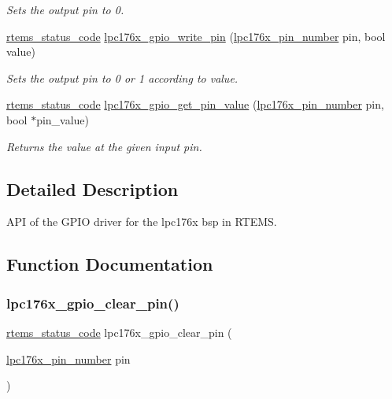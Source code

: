 \begin{DoxyCompactItemize}
\begin{DoxyCompactList}\small\item\em Sets the output pin to 0. \end{DoxyCompactList}\item 
\mbox{\hyperlink{group__ClassicStatus_ga545d41846817eaba6143d52ee4d9e9fe}{rtems\+\_\+status\+\_\+code}} \mbox{\hyperlink{lpc-gpio_8h_ad010bb47d4e2ab9c09a42193cc25d501}{lpc176x\+\_\+gpio\+\_\+write\+\_\+pin}} (\mbox{\hyperlink{common-types_8h_a8215ced1557c43bc5925b691a3c1dc23}{lpc176x\+\_\+pin\+\_\+number}} pin, bool value)
\begin{DoxyCompactList}\small\item\em Sets the output pin to 0 or 1 according to value. \end{DoxyCompactList}\item 
\mbox{\hyperlink{group__ClassicStatus_ga545d41846817eaba6143d52ee4d9e9fe}{rtems\+\_\+status\+\_\+code}} \mbox{\hyperlink{lpc-gpio_8h_a491b0e2fd8542b192bb06328b96db42c}{lpc176x\+\_\+gpio\+\_\+get\+\_\+pin\+\_\+value}} (\mbox{\hyperlink{common-types_8h_a8215ced1557c43bc5925b691a3c1dc23}{lpc176x\+\_\+pin\+\_\+number}} pin, bool $\ast$pin\+\_\+value)
\begin{DoxyCompactList}\small\item\em Returns the value at the given input pin. \end{DoxyCompactList}\end{DoxyCompactItemize}


\subsection{Detailed Description}
A\+PI of the G\+P\+IO driver for the lpc176x bsp in R\+T\+E\+MS. 



\subsection{Function Documentation}
\mbox{\label{lpc-gpio_8h_a3cdfeb2c478837ed69bf742954c7333a}} 
\subsubsection{\texorpdfstring{lpc176x\_gpio\_clear\_pin()}{lpc176x\_gpio\_clear\_pin()}}
{\footnotesize\ttfamily \mbox{\hyperlink{group__ClassicStatus_ga545d41846817eaba6143d52ee4d9e9fe}{rtems\+\_\+status\+\_\+code}} lpc176x\+\_\+gpio\+\_\+clear\+\_\+pin (\begin{DoxyParamCaption}\item[{\mbox{\hyperlink{common-types_8h_a8215ced1557c43bc5925b691a3c1dc23}{lpc176x\+\_\+pin\+\_\+number}}}]{pin }\end{DoxyParamCaption})}



